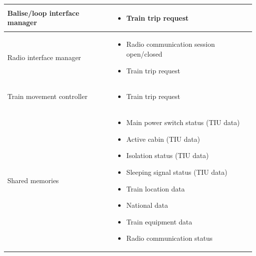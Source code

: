 \documentclass[nocc]{template/openetcs_report}
\begin{document}
\begin{longtable}{|l|l|}
				\hline	
									
	
					\begin{minipage}[t]{0.35\linewidth} Balise/loop interface manager	\end{minipage} 
				&	\begin{minipage}[t]{0.65\linewidth}
						\begin{itemize}
							\item Train trip request
						\end{itemize}			
					\end{minipage} \\
				
				\hline
													
					\begin{minipage}[t]{0.35\linewidth} Radio interface manager	\end{minipage} 
				&	\begin{minipage}[t]{0.65\linewidth}
						\begin{itemize}
							\item Radio communication session open/closed
							\item Train trip request
						\end{itemize}			
					\end{minipage} \\
				
				\hline
																	
																	
					\begin{minipage}[t]{0.35\linewidth} Train movement controller	\end{minipage} 
				&	\begin{minipage}[t]{0.65\linewidth}
						\begin{itemize}
							\item Train trip request
						\end{itemize}			
					\end{minipage} \\
				
				\hline	
				
					\begin{minipage}[t]{0.35\linewidth} Shared memories	\end{minipage} 
				&	\begin{minipage}[t]{0.65\linewidth}
						\begin{itemize}
							\item Main power switch status (TIU data)
							\item Active cabin (TIU data)
							\item Isolation status (TIU data)
							\item Sleeping signal status (TIU data)
							\item Train location data
							\item National data
							\item Train equipment data
							\item Radio communication status						
						\end{itemize}				
					\end{minipage} \\
				
				\hline	
			\end{longtable}	
\end{document}
